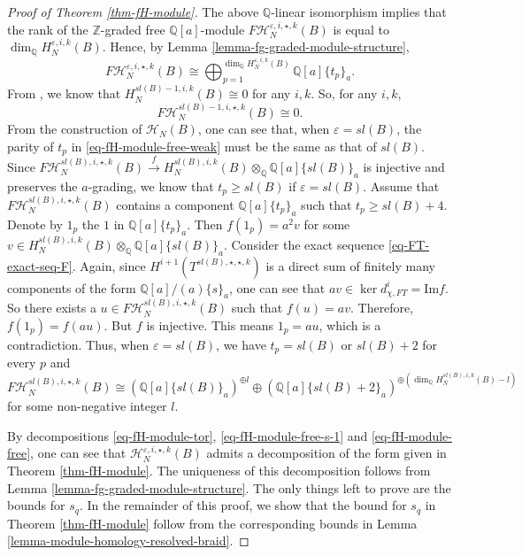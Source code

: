 \documentclass{amsart}
\theoremstyle{plain}
\theoremstyle{definition}
\theoremstyle{remark}
\numberwithin{equation}{section}
\begin{document}
\begin{proof}[Proof of Theorem \ref{thm-fH-module}]
The above ${\mathbb{Q}}$-linear isomorphism implies that the rank of the ${\mathbb{Z}}$-graded free ${\mathbb{Q}}[a]$-module $F{\mathcal{H}}_N^{{\varepsilon},i,\star,k}(B)$ is equal to $\dim_{\mathbb{Q}} H_N^{{\varepsilon},i,k}(B)$. Hence, by Lemma \ref{lemma-fg-graded-module-structure},
\begin{equation}\label{eq-fH-module-free-weak}
F{\mathcal{H}}_N^{{\varepsilon},i,\star,k}(B) \cong \bigoplus_{p=1}^{\dim_{\mathbb{Q}} H_N^{{\varepsilon},i,k}(B)} {\mathbb{Q}}[a]\{t_p\}_a.
\end{equation}
From \cite{KR1}, we know that $H_N^{sl(B)-1,i,k}(B) \cong 0$ for any $i,k$. So, for any $i,k$,
\begin{equation}\label{eq-fH-module-free-s-1}
F{\mathcal{H}}_N^{sl(B)-1,i,\star,k}(B) \cong 0.
\end{equation}
From the construction of ${\mathcal{H}}_N(B)$, one can see that, when ${\varepsilon}=sl(B)$, the parity of $t_p$ in \eqref{eq-fH-module-free-weak} must be the same as that of $sl(B)$. Since $F{\mathcal{H}}_N^{sl(B),i,\star,k}(B) \xrightarrow{f} H_N^{sl(B),i,k}(B)\otimes_{\mathbb{Q}} {\mathbb{Q}}[a]\{sl(B)\}_a$ is injective and preserves the $a$-grading, we know that $t_p \geq sl(B)$ if ${\varepsilon}=sl(B)$. Assume that $F{\mathcal{H}}_N^{sl(B),i,\star,k}(B)$ contains a component ${\mathbb{Q}}[a]\{t_p\}_a$ such that $t_p\geq sl(B)+4$. Denote by $1_p$ the $1$ in ${\mathbb{Q}}[a]\{t_p\}_a$. Then $f(1_p)=a^2 v$ for some $v\in H_N^{sl(B),i,k}(B)\otimes_{\mathbb{Q}} {\mathbb{Q}}[a]\{sl(B)\}_a$. Consider the exact sequence \eqref{eq-FT-exact-seq-F}. Again, since $H^{i+1}(T^{sl(B),\star,\star,k})$ is a direct sum of finitely many components of the form ${\mathbb{Q}}[a]/(a)\{s\}_a$, one can see that $av \in \ker d_{\chi,FT}^{i} = {\mathrm{Im}} f$. So there exists a $u \in F{\mathcal{H}}_N^{sl(B),i,\star,k}(B)$ such that $f(u)=av$. Therefore, $f(1_p)=f(au)$. But $f$ is injective. This means $1_p =au$, which is a contradiction. Thus, when ${\varepsilon}=sl(B)$, we have $t_p = sl(B)$ or $sl(B)+2$ for every $p$ and 
\begin{equation}\label{eq-fH-module-free}
F{\mathcal{H}}_N^{sl(B),i,\star,k}(B) \cong ({\mathbb{Q}}[a]\{sl(B)\}_a)^{\oplus l} \oplus ({\mathbb{Q}}[a]\{sl(B)+2\}_a)^{\oplus (\dim_{\mathbb{Q}} H_N^{sl(B),i,k}(B) - l)}
\end{equation}
for some non-negative integer $l$.

By decompositions \eqref{eq-fH-module-tor}, \eqref{eq-fH-module-free-s-1} and \eqref{eq-fH-module-free}, one can see that ${\mathcal{H}}_N^{{\varepsilon},i,\star,k}(B)$ admits a decomposition of the form given in Theorem \ref{thm-fH-module}. The uniqueness of this decomposition follows from Lemma \ref{lemma-fg-graded-module-structure}. The only things left to prove are the bounds for $s_q$. In the remainder of this proof, we show that the bound for $s_q$ in Theorem \ref{thm-fH-module} follow from the corresponding bounds in Lemma \ref{lemma-module-homology-resolved-braid}.


\end{proof}
\end{document}
